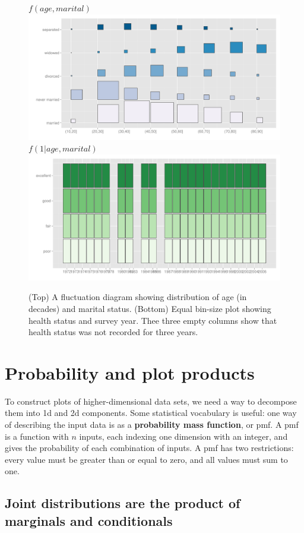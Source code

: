 \documentclass[journal]{vgtc}
\begin{document}
\begin{figure}[htbp]
  \centering
  $f(age, marital)$
    \includegraphics[width=0.9 \linewidth]{part-fluct}
  $f(1 | age, marital)$
    \includegraphics[width=0.9 \linewidth]{part-fluct-cond}
  \caption{(Top) A fluctuation diagram showing distribution of age (in decades) and marital status. (Bottom) Equal bin-size plot showing health status and survey year. Thee three empty columns show that health status was not recorded for three years.}
  \label{fig:fluct}
\end{figure}

\section{Probability and plot products}
\label{sec:combination}

To construct plots of higher-dimensional data sets, we need a way to decompose them into 1d and 2d components. Some statistical vocabulary is useful: one way of describing the input data is as a {\bf probability mass function}, or {\sc pmf}. A {\sc pmf} is a function with $n$ inputs, each indexing one dimension with an integer, and gives the probability of each combination of inputs. A {\sc pmf} has two restrictions: every value must be greater than or equal to zero, and all values must sum to one.  

\subsection{Joint distributions are the product of marginals and conditionals}
\end{document}
